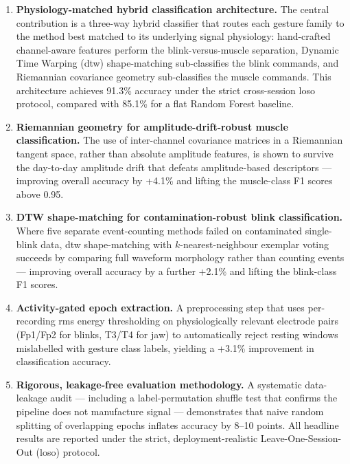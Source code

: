 \begin{enumerate}[leftmargin=*, label=\textbf{C\arabic*.}]

    \item \textbf{Physiology-matched hybrid classification
    architecture.} The central contribution is a three-way hybrid
    classifier that routes each gesture family to the method best
    matched to its underlying signal physiology: hand-crafted
    channel-aware features perform the blink-versus-muscle separation,
    Dynamic Time Warping (\acrshort{dtw}) shape-matching
    sub-classifies the blink commands, and Riemannian covariance
    geometry sub-classifies the muscle commands. This architecture
    achieves 91.3\% accuracy under the strict cross-session
    \acrshort{loso} protocol, compared with 85.1\% for a flat
    Random Forest baseline.

    \item \textbf{Riemannian geometry for amplitude-drift-robust
    muscle classification.} The use of inter-channel covariance
    matrices in a Riemannian tangent space, rather than absolute
    amplitude features, is shown to survive the day-to-day amplitude
    drift that defeats amplitude-based descriptors — improving overall
    accuracy by +4.1\% and lifting the muscle-class F1 scores above
    0.95.

    \item \textbf{DTW shape-matching for contamination-robust blink
    classification.} Where five separate event-counting methods
    failed on contaminated single-blink data, \acrshort{dtw}
    shape-matching with $k$-nearest-neighbour exemplar voting succeeds
    by comparing full waveform morphology rather than counting events
    — improving overall accuracy by a further +2.1\% and lifting the
    blink-class F1 scores.

    \item \textbf{Activity-gated epoch extraction.} A preprocessing
    step that uses per-recording \acrshort{rms} energy thresholding
    on physiologically relevant electrode pairs (Fp1/Fp2 for blinks,
    T3/T4 for jaw) to automatically reject resting windows mislabelled
    with gesture class labels, yielding a +3.1\% improvement in
    classification accuracy.

    \item \textbf{Rigorous, leakage-free evaluation methodology.}
    A systematic data-leakage audit — including a label-permutation
    shuffle test that confirms the pipeline does not manufacture
    signal — demonstrates that naive random splitting of overlapping
    epochs inflates accuracy by 8--10 points. All headline results
    are reported under the strict, deployment-realistic
    Leave-One-Session-Out (\acrshort{loso}) protocol.


\end{enumerate}
